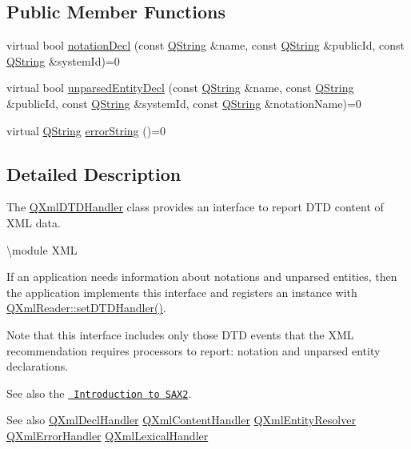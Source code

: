 \subsection*{Public Member Functions}
\begin{DoxyCompactItemize}
\item 
virtual bool \mbox{\hyperlink{class_q_xml_d_t_d_handler_a3ce7216b7646cd26bd11c4bdee883507}{notation\+Decl}} (const \mbox{\hyperlink{class_q_string}{Q\+String}} \&name, const \mbox{\hyperlink{class_q_string}{Q\+String}} \&public\+Id, const \mbox{\hyperlink{class_q_string}{Q\+String}} \&system\+Id)=0
\item 
virtual bool \mbox{\hyperlink{class_q_xml_d_t_d_handler_a956c5143b8f349a19782fb56c577e04e}{unparsed\+Entity\+Decl}} (const \mbox{\hyperlink{class_q_string}{Q\+String}} \&name, const \mbox{\hyperlink{class_q_string}{Q\+String}} \&public\+Id, const \mbox{\hyperlink{class_q_string}{Q\+String}} \&system\+Id, const \mbox{\hyperlink{class_q_string}{Q\+String}} \&notation\+Name)=0
\item 
virtual \mbox{\hyperlink{class_q_string}{Q\+String}} \mbox{\hyperlink{class_q_xml_d_t_d_handler_a40f40b9674be96a009a93147d5e0178d}{error\+String}} ()=0
\end{DoxyCompactItemize}


\subsection{Detailed Description}
The \mbox{\hyperlink{class_q_xml_d_t_d_handler}{Q\+Xml\+D\+T\+D\+Handler}} class provides an interface to report D\+TD content of X\+ML data. 

\textbackslash{}module X\+ML

If an application needs information about notations and unparsed entities, then the application implements this interface and registers an instance with \mbox{\hyperlink{class_q_xml_reader_a0b24b1fe26a4c32a8032d68ee14d5dba}{Q\+Xml\+Reader\+::set\+D\+T\+D\+Handler()}}.

Note that this interface includes only those D\+TD events that the X\+ML recommendation requires processors to report\+: notation and unparsed entity declarations.

See also the \href{xml.html\#introSAX2}{\texttt{ Introduction to S\+A\+X2}}.

\begin{DoxySeeAlso}{See also}
\mbox{\hyperlink{class_q_xml_decl_handler}{Q\+Xml\+Decl\+Handler}} \mbox{\hyperlink{class_q_xml_content_handler}{Q\+Xml\+Content\+Handler}} \mbox{\hyperlink{class_q_xml_entity_resolver}{Q\+Xml\+Entity\+Resolver}} \mbox{\hyperlink{class_q_xml_error_handler}{Q\+Xml\+Error\+Handler}} \mbox{\hyperlink{class_q_xml_lexical_handler}{Q\+Xml\+Lexical\+Handler}} 
\end{DoxySeeAlso}


